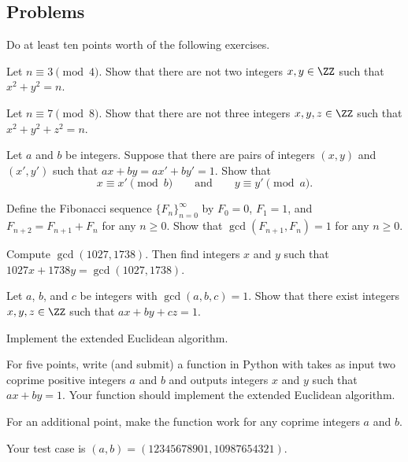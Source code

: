 \documentclass[../notes.tex]{subfiles}
\begin{document}
\subsection{Problems}
Do at least ten points worth of the following exercises.
\begin{prob}[1 point]
	Let $n\equiv3\pmod4$. Show that there are not two integers $x,y\in\ZZ$ such that $x^2+y^2=n$.
\end{prob}
\begin{prob}[2 points]
	Let $n\equiv7\pmod 8$. Show that there are not three integers $x,y,z\in\ZZ$ such that $x^2+y^2+z^2=n$.
\end{prob}
\begin{prob}[2 points]
	Let $a$ and $b$ be integers. Suppose that there are pairs of integers $(x,y)$ and $(x',y')$ such that $ax+by=ax'+by'=1$. Show that
	\[x\equiv x'\pmod b\qquad\text{and}\qquad y\equiv y'\pmod a.\]
\end{prob}
\begin{prob}[2 points]
	Define the Fibonacci sequence $\{F_n\}_{n=0}^\infty$ by $F_0=0$, $F_1=1$, and $F_{n+2}=F_{n+1}+F_n$ for any $n\ge0$. Show that $\gcd(F_{n+1},F_n)=1$ for any $n\ge0$.
\end{prob}
\begin{prob}[3 points]
	Compute $\gcd(1027,1738)$. Then find integers $x$ and $y$ such that $1027x+1738y=\gcd(1027,1738)$.
\end{prob}
\begin{prob}[3 points]
	Let $a$, $b$, and $c$ be integers with $\gcd(a,b,c)=1$. Show that there exist integers $x,y,z\in\ZZ$ such that $ax+by+cz=1$.
\end{prob}
\begin{prob}[5 or 6 points]
	Implement the extended Euclidean algorithm.
	\begin{listalph}
		\item For five points, write (and submit) a function in Python with takes as input two coprime positive integers $a$ and $b$ and outputs integers $x$ and $y$ such that $ax+by=1$. Your function should implement the extended Euclidean algorithm.
		\item For an additional point, make the function work for any coprime integers $a$ and $b$.
	\end{listalph}
	Your test case is $(a,b)=\left(12345678901,10987654321\right)$.
\end{prob}
\end{document}
